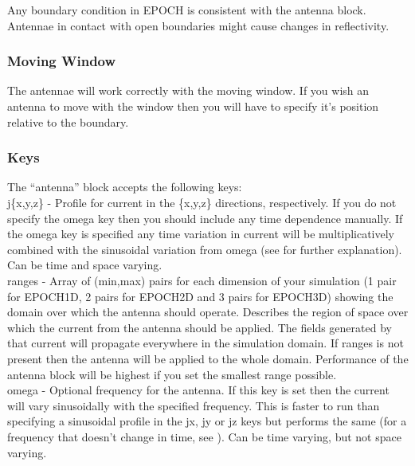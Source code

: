 Any boundary condition in EPOCH is consistent with the antenna block. Antennae
in contact with open boundaries might cause changes in reflectivity.

\subsubsection{Moving Window}

The antennae will work correctly with the moving window. If you wish an antenna
to move with the window then you will have to specify it's position relative to
the  boundary.

\subsubsection{Keys}

The ``antenna'' block accepts the following keys:\\

{\emphtext j\{x,y,z\}} -  Profile for current in the \{x,y,z\} directions,
  respectively. If you do not specify the omega key then you should include any
  time dependence manually. If the omega key is specified any time variation in
  current will be multiplicatively combined with the sinusoidal variation from
  omega (see  for further explanation). Can be time and
  space varying.\\

{\emphtext ranges} - Array of (min,max) pairs for each dimension of your
  simulation (1 pair for EPOCH1D, 2 pairs for EPOCH2D and 3 pairs for EPOCH3D)
  showing the domain over which the antenna should operate. Describes the region
  of space over which the current from the antenna should be applied. The fields
  generated by that current will propagate everywhere in the simulation domain.
  If ranges is not present then the antenna will be applied to the whole domain.
  Performance of the antenna block will be highest if you set the smallest range
  possible.\\

{\emphtext omega} -  Optional frequency for the antenna. If this key is set
  then the current will vary sinusoidally with the specified frequency. This is
  faster to run than specifying a sinusoidal profile in the jx, jy or jz keys
  but performs the same (for a frequency that doesn't change in time, see
  ). Can be time varying, but not space varying.\\

